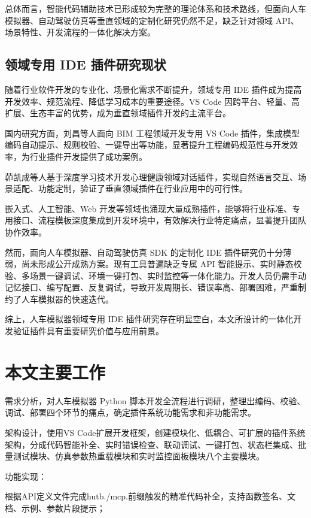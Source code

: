 总体而言，智能代码辅助技术已形成较为完整的理论体系和技术路线，但面向人车模拟器、自动驾驶仿真等垂直领域的定制化研究仍然不足，缺乏针对领域
API、场景特性、开发流程的一体化解决方案。

\subsection{领域专用 IDE 插件研究现状}

随着行业软件开发的专业化、场景化需求不断提升，领域专用 IDE
插件成为提高开发效率、规范流程、降低学习成本的重要途径。VS Code
因跨平台、轻量、高扩展、生态丰富的优势，成为垂直领域插件开发的主流平台。

国内研究方面，刘昌等人面向 BIM 工程领域开发专用 VS Code
插件，集成模型编码自动提示、规则校验、一键导出等功能，显著提升工程编码规范性与开发效率，为行业插件开发提供了成功案例\cite{ref19}。

茆凯成等人基于深度学习技术开发心理健康领域对话插件，实现自然语言交互、场景适配、功能定制，验证了垂直领域插件在行业应用中的可行性\cite{ref20}。

嵌入式、人工智能、Web
开发等领域也涌现大量成熟插件，能够将行业标准、专用接口、流程模板深度集成到开发环境中，有效解决行业特定痛点，显著提升团队协作效率。

然而，面向人车模拟器、自动驾驶仿真 SDK 的定制化 IDE
插件研究仍十分薄弱，尚未形成公开成熟方案。现有工具普遍缺乏专属 API
智能提示、实时静态校验、多场景一键调试、环境一键打包、实时监控等一体化能力。开发人员仍需手动记忆接口、编写配置、反复调试，导致开发周期长、错误率高、部署困难，严重制约了人车模拟器的快速迭代。

综上，人车模拟器领域专用 IDE
插件研究存在明显空白，本文所设计的一体化开发验证插件具有重要研究价值与应用前景。

\section{本文主要工作}

需求分析，对人车模拟器 Python
脚本开发全流程进行调研，整理出编码、校验、调试、部署四个环节的痛点，确定插件系统功能需求和非功能需求。

架构设计，使用VS Code扩展开发框架，创建模块化、低耦合、可扩展的插件系统架构，分成代码智能补全、实时错误检查、联动调试、一键打包、状态栏集成、批量测试模块、仿真参数热重载模块和实时监控面板模块八个主要模块。

功能实现：

根据API定义文件完成hutb./mcp.前缀触发的精准代码补全，支持函数签名、文档、示例、参数片段提示；

